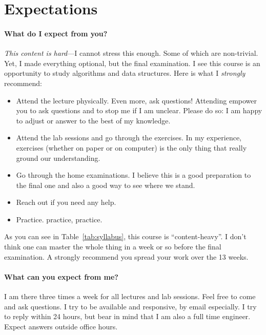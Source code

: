 \documentclass{aldast}
\begin{document}
\section{Expectations}

\paragraph{What do I expect from you?}

\emph{This content is hard}---I cannot stress this enough. Some of
which are non-trivial. Yet, I made everything optional, but the final
examination. I see this course is an opportunity to study algorithms
and data structures. Here is what I \emph{strongly} recommend:

\begin{itemize}
\item Attend the lecture physically. Even more, ask questions!
  Attending empower you to ask questions and to stop me if I am
  unclear. Please do so: I am happy to adjust or answer to the best of
  my knowledge.
\item Attend the lab sessions and go through the exercises. In my
  experience, exercises (whether on paper or on computer) is the only
  thing that really ground our understanding.
\item Go through the home examinations. I believe this is a good
  preparation to the final one and also a good way to see where we
  stand.
\item Reach out if you need any help.
\item Practice. practice, practice.
\end{itemize}

As you can see in Table~\ref{tab:syllabus}, this course is
``content-heavy''. I don't think one can master the whole thing in a
week or so before the final examination. A strongly recommend you
spread your work over the 13 weeks.

\paragraph {What can you expect from me?}

I am there three times a week for all lectures and lab sessions. Feel
free to come and ask questions. I try to be available and responsive,
by email especially. I try to
reply within 24 hours, but bear in mind that I am also a full time
engineer. Expect answers outside office hours.
\end{document}
